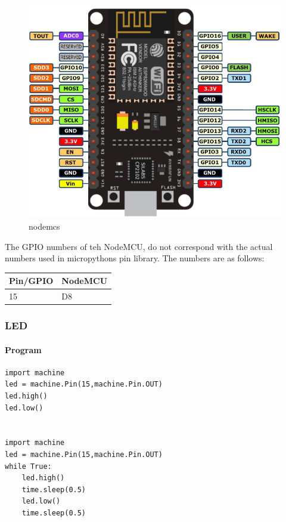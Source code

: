 \begin{figure}
\centering
\includegraphics{../images/nodemcu.png}
\caption{nodemcs}
\end{figure}

The GPIO numbers of teh NodeMCU, do not correspond with the actual
numbers used in micropythons pin library. The numbers are as follows:

\begin{longtable}[]{@{}ll@{}}
\toprule
Pin/GPIO & NodeMCU\tabularnewline
\midrule
\endhead
15 & D8\tabularnewline
\bottomrule
\end{longtable}

\subsubsection{LED}\label{led}

\paragraph{Program}\label{program}

\begin{verbatim}
import machine
led = machine.Pin(15,machine.Pin.OUT)
led.high()
led.low()


import machine
led = machine.Pin(15,machine.Pin.OUT)
while True:
    led.high()
    time.sleep(0.5)
    led.low()
    time.sleep(0.5)
\end{verbatim}

